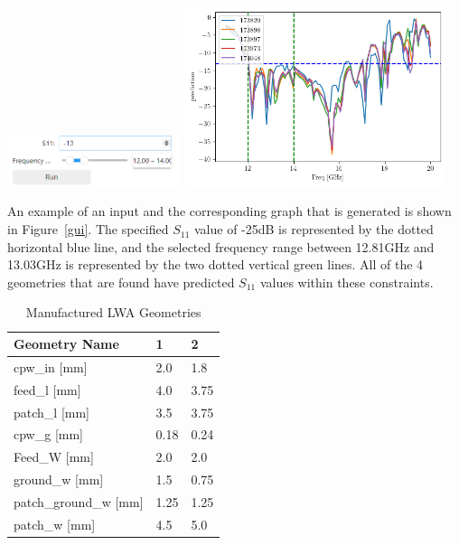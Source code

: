 \documentclass[conference]{IEEEtran}
\newenvironment{Figure}
    {\par\medskip\noindent\minipage{\linewidth}}
    {\endminipage\par\medskip}
\begin{document}
\begin{Figure}
    \centering
    \includegraphics[width=2in]{gui_input}
    \includegraphics[width=3in]{gui_graph}
    \label{gui}
\end{Figure}

An example of an input and the corresponding graph that is generated is shown in Figure~\ref{gui}. The specified $S_{11}$ value of -25dB is represented by the dotted horizontal blue line, and the selected frequency range between 12.81GHz and 13.03GHz is represented by the two dotted vertical green lines. All of the 4 geometries that are found have predicted $S_{11}$ values within these constraints. 

\begin{table}[h]
\caption{Manufactured LWA Geometries}
\begin{center}
\begin{tabular}{ 
|l|l|l|}
    \hline
    Geometry Name & 1 & 2 \\
    \hline
    cpw\_in [mm] & 2.0 & 1.8 \\
    \hline
    feed\_l [mm] & 4.0 & 3.75 \\
    \hline
    patch\_l [mm] & 3.5 & 3.75 \\
    \hline
    cpw\_g [mm] & 0.18 & 0.24 \\
    \hline
    Feed\_W [mm] & 2.0 & 2.0 \\
    \hline
    ground\_w [mm] & 1.5 & 0.75 \\
    \hline
    patch\_ground\_w [mm] & 1.25 & 1.25 \\
    \hline
    patch\_w [mm] & 4.5 & 5.0 \\
    \hline
\end{tabular}
\end{center}
\label{manufactured_geometries_list}
\end{table}
\end{document}
